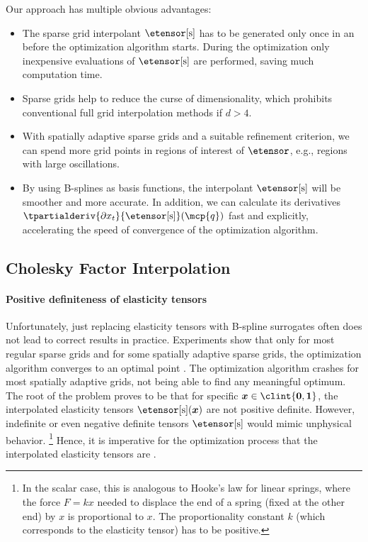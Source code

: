 Our approach has multiple obvious advantages:
\begin{itemize}
  \item
  The sparse grid interpolant $\etensor[\sparse]$ has to be generated only
  once in an  before the optimization algorithm starts.
  During the optimization 
  only inexpensive evaluations of $\etensor[\sparse]$ are performed,
  saving much computation time.
  
  \item
  Sparse grids help to reduce the curse of dimensionality, which prohibits
  conventional full grid interpolation methods if $d > 4$.
  
  \item
  With spatially adaptive sparse grids and a suitable refinement criterion,
  we can spend more grid points in regions of interest of $\etensor$,
  e.g., regions with large oscillations.
  
  \item
  By using B-splines as basis functions,
  the interpolant $\etensor[\sparse]$ will be smoother and more accurate.
  In addition, we can calculate its derivatives
  $\tpartialderiv{\partialdiff{} x_t}{\etensor[\sparse]}(\mcp{q})$
  fast and explicitly,
  accelerating the speed of convergence of the optimization algorithm.
\end{itemize}



\subsection{Cholesky Factor Interpolation}
\label{sec:623cholesky}

\paragraph{Positive definiteness of elasticity tensors}

Unfortunately, just replacing elasticity tensors with
B-spline surrogates often does not lead to correct results in practice.
Experiments show that only for most regular sparse grids and
for some spatially adaptive sparse grids,
the optimization algorithm converges to an optimal point
\cite{Valentin16Hierarchical}.
The optimization algorithm crashes for most spatially adaptive grids,
not being able to find any meaningful optimum.
%
The root of the problem proves to be that for specific
$\*x \in \clint{\*0, \*1}$,
the interpolated elasticity tensors $\etensor[\sparse](\*x)$ are not
positive definite.
However, indefinite or even negative definite tensors $\etensor[\sparse]$
would mimic unphysical behavior.%
\footnote{%
  In the scalar case, this is analogous to Hooke's law for linear springs,
  where the force $F = kx$ needed to displace the end of a spring
  (fixed at the other end) by $x$ is proportional to $x$.
  The proportionality constant $k$ (which corresponds to the elasticity tensor)
  has to be positive.%
}
Hence, it is imperative for the optimization process that
the interpolated elasticity tensors are \spd.

